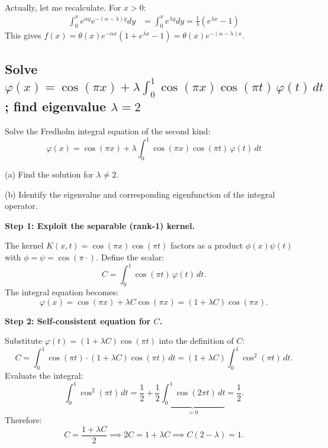 \documentclass[a4paper,11pt]{article} %
\begin{document}
Actually, let me recalculate. For $x>0$:
\begin{align*}
    \int_{0}^{x} e^{\alpha y} e^{-(\alpha-\lambda)y} dy &= \int_{0}^{x} e^{\lambda y} dy = \frac{1}{\lambda}(e^{\lambda x} - 1)
\end{align*}
This gives $f(x) = \theta(x)e^{-\alpha x}(1 + e^{\lambda x} - 1) = \theta(x)e^{-(\alpha-\lambda)x}$. \checkmark

\newpage
\subsection{\texorpdfstring{Solve $\varphi(x)=\cos(\pi x)+\lambda\int_0^1\cos(\pi x)\cos(\pi t)\,\varphi(t)\,dt$; find eigenvalue $\lambda=2$}{Fredholm IE with rank-1 kernel; unique solution $\frac{2}{2-\lambda}\cos(\pi x)$ for $\lambda\ne 2$; $\lambda=2$ is eigenvalue with eigenfunction $\cos(\pi x)$}}

\begin{problembox}
Solve the Fredholm integral equation of the second kind:
$$\varphi(x) = \cos(\pi x) + \lambda \int_0^1 \cos(\pi x)\cos(\pi t)\,\varphi(t)\,dt$$

(a) Find the solution for $\lambda \neq 2$.

(b) Identify the eigenvalue and corresponding eigenfunction of the integral operator.
\end{problembox}

\textbf{Step 1: Exploit the separable (rank-1) kernel.}

The kernel $K(x,t) = \cos(\pi x)\cos(\pi t)$ factors as a product $\phi(x)\psi(t)$ with $\phi = \psi = \cos(\pi\cdot)$.
Define the scalar:
\[
    C = \int_0^1 \cos(\pi t)\,\varphi(t)\,dt.
\]
The integral equation becomes:
\[
    \varphi(x) = \cos(\pi x) + \lambda C \cos(\pi x) = (1 + \lambda C)\cos(\pi x).
\]

\textbf{Step 2: Self-consistent equation for $C$.}

Substitute $\varphi(t) = (1+\lambda C)\cos(\pi t)$ into the definition of $C$:
\[
    C = \int_0^1 \cos(\pi t)\cdot(1+\lambda C)\cos(\pi t)\,dt = (1+\lambda C)\int_0^1\cos^2(\pi t)\,dt.
\]
Evaluate the integral:
\[
    \int_0^1\cos^2(\pi t)\,dt = \frac{1}{2} + \frac{1}{2}\underbrace{\int_0^1\cos(2\pi t)\,dt}_{=0} = \frac{1}{2}.
\]
Therefore:
\[
    C = \frac{1+\lambda C}{2} \implies 2C = 1 + \lambda C \implies C(2-\lambda) = 1.
\]
\end{document}
